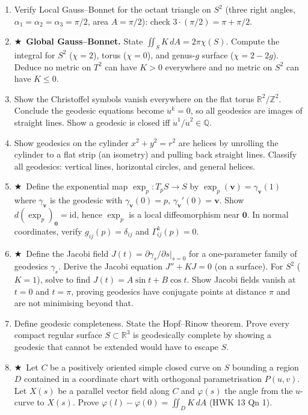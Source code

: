 \documentclass[11pt, a4paper]{article}
\newcommand{\R}{\mathbb{R}}
\newcommand{\Z}{\mathbb{Z}}
\newcommand{\hard}{$\bigstar$\ }
\begin{document}
\begin{enumerate}[label=\textbf{Q\arabic*.}, leftmargin=*, itemsep=6pt]
\item Verify Local Gauss--Bonnet for the octant triangle on $S^2$ (three right angles, $\alpha_1=\alpha_2=\alpha_3=\pi/2$, area $A=\pi/2$): check $3\cdot(\pi/2)=\pi+\pi/2$.

\item \hard \textbf{Global Gauss--Bonnet.} State $\iint_S K\,dA=2\pi\chi(S)$. Compute the integral for $S^2$ ($\chi=2$), torus ($\chi=0$), and genus-$g$ surface ($\chi=2-2g$). Deduce no metric on $T^2$ can have $K>0$ everywhere and no metric on $S^2$ can have $K\leq 0$.

\item Show the Christoffel symbols vanish everywhere on the flat torus $\R^2/\Z^2$. Conclude the geodesic equations become $\ddot{u}^k=0$, so all geodesics are images of straight lines. Show a geodesic is closed iff $\dot{u}^1/\dot{u}^2\in\mathbb{Q}$.

\item Show geodesics on the cylinder $x^2+y^2=r^2$ are helices by unrolling the cylinder to a flat strip (an isometry) and pulling back straight lines. Classify all geodesics: vertical lines, horizontal circles, and general helices.

\item \hard Define the exponential map $\exp_p:T_pS\to S$ by $\exp_p(\mathbf{v})=\gamma_{\mathbf{v}}(1)$ where $\gamma_{\mathbf{v}}$ is the geodesic with $\gamma_{\mathbf{v}}(0)=p$, $\gamma_{\mathbf{v}}'(0)=\mathbf{v}$. Show $d(\exp_p)_{\mathbf{0}}=\mathrm{id}$, hence $\exp_p$ is a local diffeomorphism near $\mathbf{0}$. In normal coordinates, verify $g_{ij}(p)=\delta_{ij}$ and $\Gamma_{ij}^k(p)=0$.

\item \hard Define the Jacobi field $J(t)=\partial\gamma_s/\partial s|_{s=0}$ for a one-parameter family of geodesics $\gamma_s$. Derive the Jacobi equation $J''+KJ=0$ (on a surface). For $S^2$ ($K=1$), solve to find $J(t)=A\sin t+B\cos t$. Show Jacobi fields vanish at $t=0$ and $t=\pi$, proving geodesics have conjugate points at distance $\pi$ and are not minimising beyond that.

\item Define geodesic completeness. State the Hopf--Rinow theorem. Prove every compact regular surface $S\subset\R^3$ is geodesically complete by showing a geodesic that cannot be extended would have to escape $S$.

\item \hard Let $C$ be a positively oriented simple closed curve on $S$ bounding a region $D$ contained in a coordinate chart with orthogonal parametrisation $P(u,v)$. Let $X(s)$ be a parallel vector field along $C$ and $\varphi(s)$ the angle from the $u$-curve to $X(s)$. Prove $\varphi(l)-\varphi(0)=\iint_D K\,dA$ (HWK 13 Qn 1).


\end{enumerate}
\end{document}
